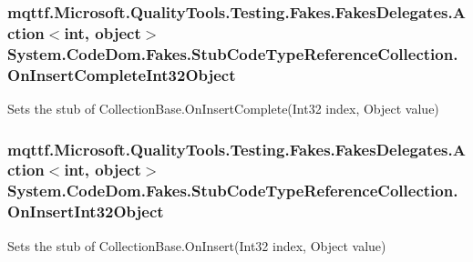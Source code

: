 \hypertarget{class_system_1_1_code_dom_1_1_fakes_1_1_stub_code_type_reference_collection_aaf8b9b7eb3c97d1b2be55935eb7f6251}{
\subsubsection[{On\-Insert\-Complete\-Int32\-Object}]{\setlength{\rightskip}{0pt plus 5cm}mqttf.\-Microsoft.\-Quality\-Tools.\-Testing.\-Fakes.\-Fakes\-Delegates.\-Action$<$int, object$>$ System.\-Code\-Dom.\-Fakes.\-Stub\-Code\-Type\-Reference\-Collection.\-On\-Insert\-Complete\-Int32\-Object}}\label{class_system_1_1_code_dom_1_1_fakes_1_1_stub_code_type_reference_collection_aaf8b9b7eb3c97d1b2be55935eb7f6251}


Sets the stub of Collection\-Base.\-On\-Insert\-Complete(\-Int32 index, Object value)

\hypertarget{class_system_1_1_code_dom_1_1_fakes_1_1_stub_code_type_reference_collection_ad38ea7ce1c78296078d36797c1f3a5e8}{
\subsubsection[{On\-Insert\-Int32\-Object}]{\setlength{\rightskip}{0pt plus 5cm}mqttf.\-Microsoft.\-Quality\-Tools.\-Testing.\-Fakes.\-Fakes\-Delegates.\-Action$<$int, object$>$ System.\-Code\-Dom.\-Fakes.\-Stub\-Code\-Type\-Reference\-Collection.\-On\-Insert\-Int32\-Object}}\label{class_system_1_1_code_dom_1_1_fakes_1_1_stub_code_type_reference_collection_ad38ea7ce1c78296078d36797c1f3a5e8}


Sets the stub of Collection\-Base.\-On\-Insert(\-Int32 index, Object value)

